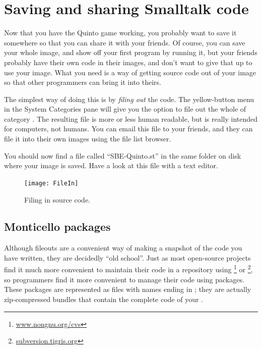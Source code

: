 \documentclass[a4paper,10pt,twoside]{book}
\begin{document}
\section{Saving and sharing Smalltalk code}
\label{sec:Monticello}

Now that you have the Quinto game working, you probably want to save it somewhere so that you can share it with your friends. Of course, you can save your whole \squeak image, and show off your first program by running it, but your friends probably have their own code in their images, and don't want to give that up to use your image.
What you need is a way of getting source code out of your \squeak image so that other programmers can bring it into theirs.

The simplest way of doing this is by \emph{filing out} the code.  The yellow-button menu in the System Categories pane will give you the option to file out the whole of category .
The resulting file is more or less human readable, but is really intended for computers, not humans.
You can email this file to your friends, and they can file it into their own \squeak images using the file list browser.

You should now find a file called ``SBE-Quinto.st'' in the same folder on disk where your image is saved.
Have a look at this file with a text editor.


\begin{figure}[ht]
\centerline {\texttt{[image: FileIn]}}
\caption{Filing in \squeak source code.
\label{fig:filein}}
\end{figure}

\subsection{Monticello packages}
Although fileouts are a convenient way of making a snapshot of the code you have written, they are decidedly ``old school''.
Just as most open-source projects find it much more convenient to maintain their code in a repository using \footnote{\url{www.nongnu.org/cvs}} or \footnote{\url{subversion.tigris.org}},
so \squeak programmers find it more convenient to manage their code using  packages. 
These packages are represented as files with names ending in ; they are actually zip-compressed bundles that contain the complete code of your .
\end{document}
